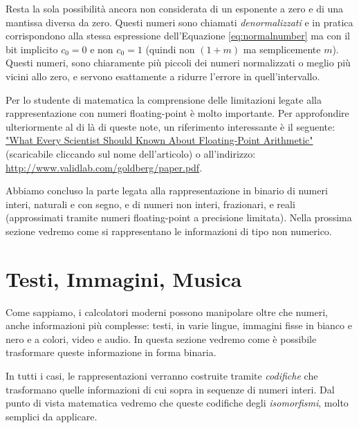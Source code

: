 Resta la sola possibilità ancora non considerata di un esponente a zero e di una
mantissa diversa da zero. Questi numeri sono chiamati \emph{denormalizzati} e
in pratica corrispondono alla stessa espressione dell'Equazione \ref{eq:normalnumber} ma con il bit implicito $c_0 = 0$ e non $c_0 = 1$ (quindi non $(1 + m)$ ma semplicemente $m$). Questi numeri, sono chiaramente più piccoli dei numeri normalizzati o meglio più vicini allo zero, e servono esattamente a ridurre l'errore in quell'intervallo.

Per lo studente di matematica la comprensione delle limitazioni legate alla
rappresentazione con numeri floating-point è molto importante. Per approfondire
ulteriormente al di là di queste note, un riferimento interessante è il
seguente: \href{http://www.validlab.com/goldberg/paper.pdf}{"What Every Scientist Should Known About Floating-Point Arithmetic"} (scaricabile 
cliccando sul nome dell'articolo) o all'indirizzo: \url{http://www.validlab.com/goldberg/paper.pdf}.

Abbiamo concluso la parte legata alla rappresentazione in binario di numeri interi, naturali e con segno, e di numeri non interi, frazionari, e reali (approssimati tramite numeri floating-point a precisione limitata). Nella prossima sezione vedremo come si rappresentano le informazioni di tipo non numerico.

\section{Testi, Immagini, Musica}

Come sappiamo, i calcolatori moderni possono manipolare oltre che numeri, anche informazioni più complesse: testi, in varie lingue, immagini fisse in bianco e nero e a colori, video e audio. In questa sezione vedremo come è possibile trasformare queste informazione in forma binaria.

In tutti i casi, le rappresentazioni verranno costruite tramite \emph{codifiche}
che trasformano quelle informazioni di cui sopra in sequenze di numeri interi.
Dal punto di vista matematica vedremo che queste codifiche degli \emph{isomorfismi}, molto semplici da applicare. 

